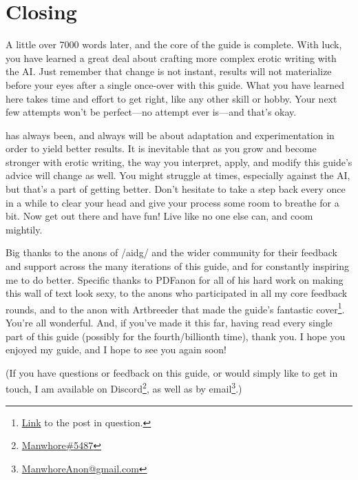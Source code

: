 ﻿\documentclass[Coomer-main.tex]{subfiles}
\begin{document}
\begin{enumerate}
\end{enumerate}

\chapter{Closing}

 A little over 7000 words later, and the core of the guide is complete.
With luck, you have learned a great deal about crafting more complex erotic writing with the AI.
Just remember that change is not instant, results will not materialize before your eyes after a single once-over with this guide.
What you have learned here takes time and effort to get right, like any other skill or hobby.
Your next few attempts won't be perfect—no attempt ever is—and that's okay.

\aid has always been, and always will be about adaptation and experimentation in order to yield better results.
It is inevitable that as you grow and become stronger with erotic writing, the way you interpret, apply, and modify this guide's advice will change as well.
You might struggle at times, especially against the AI, but that's a part of getting better.
Don't hesitate to take a step back every once in a while to clear your head and give your process some room to breathe for a bit.
Now get out there and have fun!
Live like no one else can, and coom mightily.

Big thanks to the anons of /aidg/ and the wider \aid community for their feedback and support across the many iterations of this guide, and for constantly inspiring me to do better.
Specific thanks to PDFanon for all of his hard work on making this wall of text look sexy, to the anons who participated in all my core feedback rounds, and to the anon with Artbreeder that made the guide’s fantastic cover\footnote{\href{https://arch.b4k.co/vg/thread/313360917/\#q313434592}{Link} to the post in question.}.
You're all wonderful.
And, if you've made it this far, having read every single part of this guide (possibly for the fourth/billionth time), thank you.
I hope you enjoyed my guide, and I hope to see you again soon!
\bigskip

(If you have questions or feedback on this guide, or would simply like to get in touch, I am available on Discord\footnote{\href{https://discordapp.com/users/773014944718389248}{Manwhore\#5487}}, as well as by email\footnote{\href{mailto:ManwhoreAnon@gmail.com}{ManwhoreAnon@gmail.com}}.)
\end{document}
